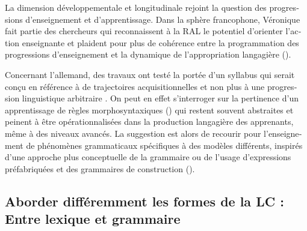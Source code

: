 \documentclass[output=paper]{langscibook}
\begin{document}
\begin{otherlanguage}{french}
La dimension développementale et longitudinale rejoint la question des progressions d’enseignement et d’apprentissage. Dans la sphère francophone, Véronique fait partie des chercheurs qui reconnaissent à la RAL le potentiel d’orienter l’action enseignante et plaident pour plus de cohérence entre la programmation des progressions d’enseignement et la dynamique de l’appropriation langagière (\citealt{Véronique2008,Véronique2017, VéroniqueEtAl2009}). 

Concernant l’allemand, des travaux ont testé la portée d’un syllabus qui serait conçu en référence à de trajectoires acquisitionnelles et non plus à une progression linguistique arbitraire \citep{Winkler2017}. On peut en effet s’interroger sur la pertinence d’un apprentissage de règles morphosyntaxiques (\citealt{Schmale2021,Felce2020}) qui restent souvent abstraites et peinent à être opérationnalisées dans la production langagière des apprenants, même à des niveaux avancés. La suggestion est alors de recourir pour l’enseignement de phénomènes grammaticaux spécifiques à des modèles différents, inspirés d’une approche plus conceptuelle de la grammaire \citep{Felce2016} ou de l’usage d’expressions préfabriquées et des grammaires de construction (\citealt{Schmale2014,Schmale2021}).   

\subsection{Aborder différemment les formes de la LC : Entre lexique et grammaire}\label{sec:felce:4.1}


\end{otherlanguage}
\end{document}
